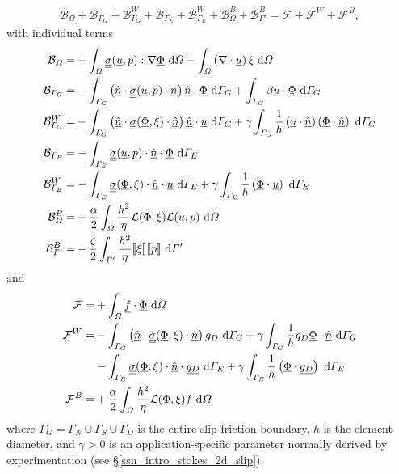 \begin{align}
  \label{intro_stokes_slip_stab_var_form}
  \mathcal{B}_{\Omega} + \mathcal{B}_{\Gamma_G} + \mathcal{B}_{\Gamma_G}^W + \mathcal{B}_{\Gamma_E} + \mathcal{B}_{\Gamma_E}^W + \mathcal{B}_{\Omega}^B + \mathcal{B}_{\Gamma'}^B = \mathcal{F} + \mathcal{F}^W + \mathcal{F}^B,
\end{align}
with individual terms
\begin{align*}
  \mathcal{B}_{\varOmega} = &+ \int_{\varOmega} \underline{\underline{\sigma}}(\underline{u},p) : \nabla \underline{\Phi} \ \mathrm{d}\varOmega + \int_{\varOmega} \left( \nabla \cdot \underline{u} \right) \xi \ \mathrm{d}\varOmega \\
  \mathcal{B}_{\varGamma_G} = &- \int_{\varGamma_G} \left( \underline{\hat{n}} \cdot \underline{\underline{\sigma}}(\underline{u},p) \cdot \underline{\hat{n}} \right) \underline{\hat{n}} \cdot \underline{\Phi} \ \mathrm{d}\varGamma_G + \int_{\varGamma_G} \beta \underline{u} \cdot \underline{\Phi} \ \mathrm{d}\varGamma_G \\
  \mathcal{B}_{\varGamma_G}^W = &- \int_{\varGamma_G} \left( \underline{\hat{n}} \cdot \underline{\underline{\sigma}}(\underline{\Phi},\xi) \cdot \underline{\hat{n}} \right) \underline{\hat{n}} \cdot \underline{u}  \ \mathrm{d}\varGamma_G + \gamma \int_{\varGamma_G} \frac{1}{h} \left( \underline{u} \cdot \underline{\hat{n}} \right) \left( \underline{\Phi} \cdot \underline{\hat{n}} \right) \ \mathrm{d}\varGamma_G \\
  \mathcal{B}_{\varGamma_E} = &- \int_{\varGamma_E} \underline{\underline{\sigma}}(\underline{u},p) \cdot \underline{\hat{n}} \cdot \underline{\Phi} \ \mathrm{d}\varGamma_E \\
  \mathcal{B}_{\varGamma_E}^W = &- \int_{\varGamma_E} \underline{\underline{\sigma}}(\underline{\Phi},\xi) \cdot \underline{\hat{n}} \cdot \underline{u} \ \mathrm{d}\varGamma_E + \gamma \int_{\varGamma_E} \frac{1}{h}  \left( \underline{\Phi} \cdot \underline{u} \right) \ \mathrm{d}\varGamma_E \\
  \mathcal{B}_{\varOmega}^B = &+ \frac{\alpha}{2} \int_{\varOmega} \frac{h^2}{\eta} \mathcal{L}(\underline{\Phi},\xi) \mathcal{L}(\underline{u},p) \ \mathrm{d}\varOmega \\
  \mathcal{B}_{\varGamma'}^B = &+ \frac{\zeta}{2} \int_{\varGamma'} \frac{h^2}{\eta} \llbracket \xi \rrbracket \llbracket p \rrbracket \ \mathrm{d}\varGamma'
\end{align*}
and
\begin{align*}
  \mathcal{F} = &+ \int_{\varOmega} \underline{f} \cdot \underline{\Phi} \ \mathrm{d}\varOmega \\ 
  \mathcal{F}^W = &- \int_{\varGamma_G} \left( \underline{\hat{n}} \cdot \underline{\underline{\sigma}}(\underline{\Phi},\xi) \cdot \underline{\hat{n}} \right) g_D \ \mathrm{d}\varGamma_G + \gamma \int_{\varGamma_G} \frac{1}{h} g_D \underline{\Phi} \cdot \underline{\hat{n}} \ \mathrm{d}\varGamma_G \\
  &- \int_{\varGamma_E} \underline{\underline{\sigma}}(\underline{\Phi},\xi) \cdot \underline{\hat{n}} \cdot \underline{g_D} \ \mathrm{d}\varGamma_E + \gamma \int_{\varGamma_E} \frac{1}{h} \left( \underline{\Phi} \cdot \underline{g_D} \right) \ \mathrm{d}\varGamma_E \\
  \mathcal{F}^B = & +\frac{\alpha}{2} \int_{\varOmega} \frac{h^2}{\eta} \mathcal{L}(\underline{\Phi},\xi) f \ \mathrm{d}\varOmega
\end{align*}
where $\Gamma_G = \Gamma_N \cup \Gamma_S \cup \Gamma_D$ is the entire slip-friction boundary, $h$ is the element diameter, and $\gamma > 0$ is an application-specific parameter normally derived by experimentation (see \S \ref{ssn_intro_stokes_2d_slip}).

